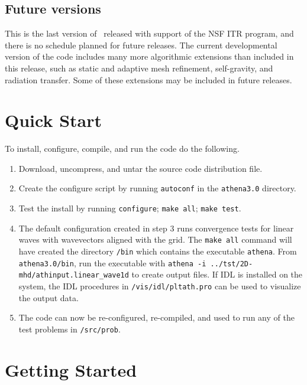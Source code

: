 \subsection{Future versions}

This is the last version of \ath\ released with support of the NSF
ITR program, and there is no schedule planned for future releases.
The current developmental version of the code includes many more
algorithmic extensions than included in this release, such as static and
adaptive mesh refinement, self-gravity, and radiation transfer.
Some of these extensions may be included in future releases.

\section{Quick Start}

To install, configure, compile, and run the code do the following.
\begin{enumerate}

\item Download, uncompress, and untar the source code distribution file.

\item Create the configure script by running {\tt autoconf} in the
{\tt athena3.0} directory.

\item Test the install by running {\tt configure}; {\tt make all};
{\tt make test}.

\item The default configuration created in step 3 runs convergence
tests for linear waves with wavevectors aligned with the grid.
The {\tt make all} command will have created the directory {\tt /bin} which
contains the executable {\tt athena}.  From {\tt athena3.0/bin}, run the
executable with 
{\tt athena -i ../tst/2D-mhd/athinput.linear\_wave1d} to create output files.
If IDL is installed on the system, the IDL procedures in {\tt /vis/idl/pltath.pro} can be used to visualize the output data.

\item The code can now be re-configured, re-compiled, and used to run any
of the test problems in {\tt /src/prob}.

\end{enumerate}

\section{Getting Started}

